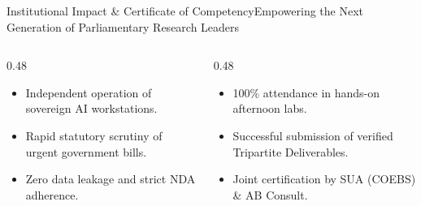 \documentclass[aspectratio=169, 10pt]{beamer}
\begin{document}
\begin{frame}{Institutional Impact \& Certificate of Competency}{Empowering the Next Generation of Parliamentary Research Leaders}
  \begin{columns}[c]
    \begin{column}{0.48\textwidth}
      \begin{tcolorbox}[colback=lightgrey, colframe=tanzaniablue, arc=1.5mm, boxrule=0.8pt, title=\textbf{Institutional Competencies}]
        \small
        \begin{itemize}
          \item Independent operation of sovereign AI workstations.
          \item Rapid statutory scrutiny of urgent government bills.
          \item Zero data leakage and strict NDA adherence.
        \end{itemize}
      \end{tcolorbox}
    \end{column}
    \begin{column}{0.48\textwidth}
      \begin{tcolorbox}[colback=calloutbg, colframe=suagreen, arc=1.5mm, boxrule=0.8pt, title=\textbf{Certification Criteria}]
        \small
        \begin{itemize}
          \item 100\% attendance in hands-on afternoon labs.
          \item Successful submission of verified Tripartite Deliverables.
          \item Joint certification by SUA (COEBS) \& AB Consult.
        \end{itemize}
      \end{tcolorbox}
    \end{column}
  \end{columns}
\end{frame}
\end{document}
